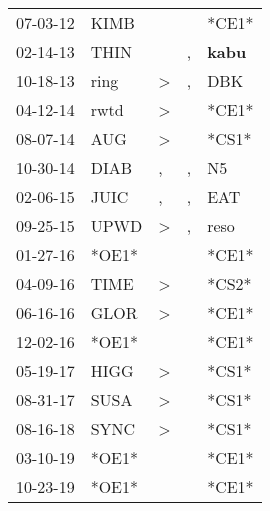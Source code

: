 \begin{supertabular}{p{0.07\textwidth}p{0.06\textwidth}p{0.02\textwidth}p{0.02\textwidth}p{0.06\textwidth}}
 07-03-12\textsuperscript{} &  KIMB\textsuperscript{} &               &               &                            *CE1* \\
 02-14-13\textsuperscript{} &  THIN\textsuperscript{} &               &             , &  \textbf{kabu\textsuperscript{}} \\
 10-18-13\textsuperscript{} &  ring\textsuperscript{} &  \textgreater &             , &            DBK\textsuperscript{} \\
 04-12-14\textsuperscript{} &  rwtd\textsuperscript{} &  \textgreater &               &                            *CE1* \\
 08-07-14\textsuperscript{} &   AUG\textsuperscript{} &  \textgreater &               &                            *CS1* \\
 10-30-14\textsuperscript{} &  DIAB\textsuperscript{} &             , &             , &             N5\textsuperscript{} \\
 02-06-15\textsuperscript{} &  JUIC\textsuperscript{} &             , &             , &            EAT\textsuperscript{} \\
 09-25-15\textsuperscript{} &  UPWD\textsuperscript{} &  \textgreater &             , &           reso\textsuperscript{} \\
 01-27-16\textsuperscript{} &                   *OE1* &               &               &                            *CE1* \\
 04-09-16\textsuperscript{} &  TIME\textsuperscript{} &  \textgreater &               &                            *CS2* \\
 06-16-16\textsuperscript{} &  GLOR\textsuperscript{} &  \textgreater &               &                            *CE1* \\
 12-02-16\textsuperscript{} &                   *OE1* &               &               &                            *CE1* \\
 05-19-17\textsuperscript{} &  HIGG\textsuperscript{} &  \textgreater &               &                            *CS1* \\
 08-31-17\textsuperscript{} &  SUSA\textsuperscript{} &  \textgreater &               &                            *CS1* \\
 08-16-18\textsuperscript{} &  SYNC\textsuperscript{} &  \textgreater &               &                            *CS1* \\
 03-10-19\textsuperscript{} &                   *OE1* &               &               &                            *CE1* \\
 10-23-19\textsuperscript{} &                   *OE1* &               &               &                            *CE1* \\
\end{supertabular}
